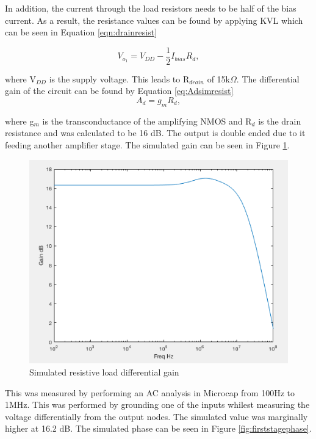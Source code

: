 In addition, the current through the load resistors needs to be half of the bias current. As a result, the resistance values can be found by applying KVL which can be seen in Equation \ref{eqn:drainresist} 

\begin{equation}
V_{o_1} = V_{DD} - \frac{1}{2}I_{bias} R_d,
\label{eqn:drainresist}
\end{equation}

where V$_{DD}$ is the supply voltage. This leads to R$_{drain}$ of 15k$\Omega$.  The differential gain of the circuit can be found by Equation \ref{eq:Adsimresist} 
\begin{equation}\label{eq:Adsimresist}
A_d = g_m R_d,
\end{equation}

where g$_m$ is the transconductance of the amplifying NMOS and R$_d$ is the drain resistance and was calculated to be 16 dB. The output is double ended due to it feeding another amplifier stage. The simulated gain can be seen in  Figure \ref{fig:adsimresist}.


\begin{figure}[H]
    \begin{center}
    \includegraphics[scale=.30]{Simulations/gainfirststage.png}
    \caption{Simulated resistive load differential gain}
    \label{fig:adsimresist}
    \end{center}
\end{figure}
This was measured by performing an AC analysis in Microcap from 100Hz to 1MHz. This was performed by grounding one of the inputs whilest measuring the voltage differentially from the output nodes. The simulated value was marginally higher at 16.2 dB. The simulated phase can be seen in Figure  \ref{fig:firststagephase}.

